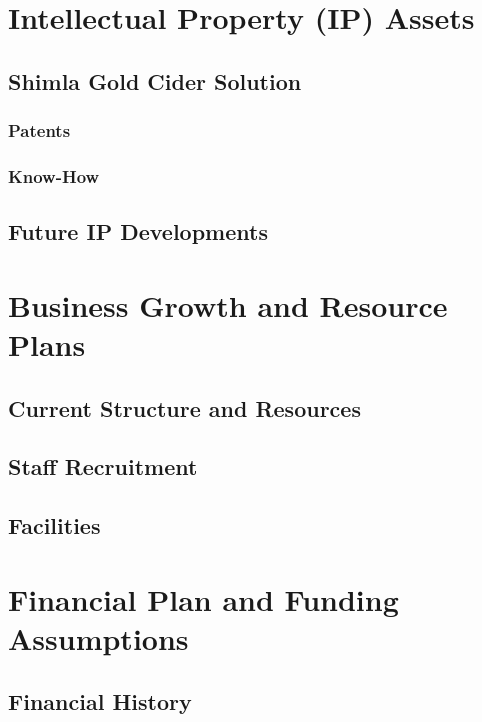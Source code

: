 \documentclass[11pt]{article}
\begin{document}
\section{Intellectual Property (IP) Assets}
  \subsection{Shimla Gold Cider Solution}
    \subsubsection{Patents}
    \subsubsection{Know-How}
  \subsection{Future IP Developments}
\newpage
\section{Business Growth and Resource Plans}
  \subsection{Current Structure and Resources}
  \subsection{Staff Recruitment}
  \subsection{Facilities}
\newpage
\section{Financial Plan and Funding Assumptions}
  \subsection{Financial History}
\end{document}
